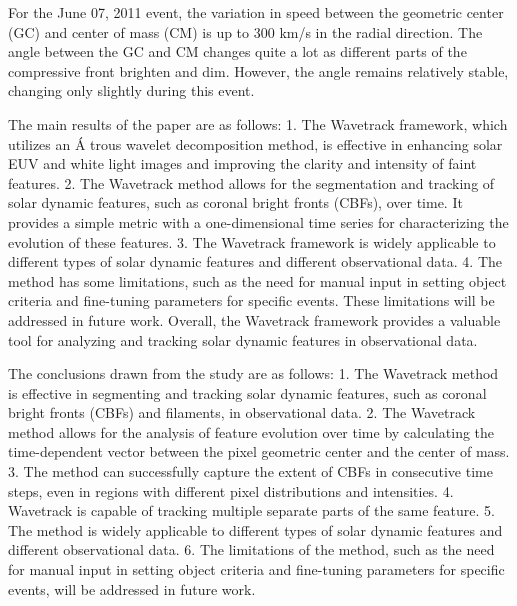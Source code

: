 For the June 07, 2011 event, the variation in speed between the geometric center (GC) and center of mass (CM) is up to 300 km/s in the radial direction. The angle between the GC and CM changes quite a lot as different parts of the compressive front brighten and dim. However, the angle remains relatively stable, changing only slightly during this event.

The main results of the paper are as follows:
1. The Wavetrack framework, which utilizes an \'A trous wavelet decomposition method, is effective in enhancing solar EUV and white light images and improving the clarity and intensity of faint features.
2. The Wavetrack method allows for the segmentation and tracking of solar dynamic features, such as coronal bright fronts (CBFs), over time. It provides a simple metric with a one-dimensional time series for characterizing the evolution of these features.
3. The Wavetrack framework is widely applicable to different types of solar dynamic features and different observational data.
4. The method has some limitations, such as the need for manual input in setting object criteria and fine-tuning parameters for specific events. These limitations will be addressed in future work.
Overall, the Wavetrack framework provides a valuable tool for analyzing and tracking solar dynamic features in observational data.

The conclusions drawn from the study are as follows:
1. The Wavetrack method is effective in segmenting and tracking solar dynamic features, such as coronal bright fronts (CBFs) and filaments, in observational data.
2. The Wavetrack method allows for the analysis of feature evolution over time by calculating the time-dependent vector between the pixel geometric center and the center of mass.
3. The method can successfully capture the extent of CBFs in consecutive time steps, even in regions with different pixel distributions and intensities.
4. Wavetrack is capable of tracking multiple separate parts of the same feature.
5. The method is widely applicable to different types of solar dynamic features and different observational data.
6. The limitations of the method, such as the need for manual input in setting object criteria and fine-tuning parameters for specific events, will be addressed in future work.





